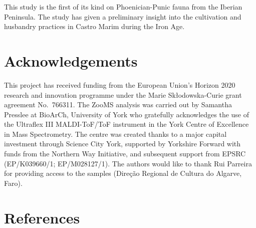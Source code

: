 \documentclass[preprint, 3p, authoryear]{elsarticle} %
\begin{document}
This study is the first of its kind on Phoenician-Punic fauna from the Iberian Peninsula. The study has given a preliminary insight into the cultivation and husbandry practices in Castro Marim during the Iron Age.

\hypertarget{acknowledgements}{%
\section{Acknowledgements}\label{acknowledgements}}

This project has received funding from the European Union's Horizon 2020 research and innovation programme under the Marie Skłodowska-Curie grant agreement No.~766311. The ZooMS analysis was carried out by Samantha Presslee at BioArCh, University of York who gratefully acknowledges the use of the Ultraflex III MALDI-ToF/ToF instrument in the York Centre of Excellence in Mass Spectrometry. The centre was created thanks to a major capital investment through Science City York, supported by Yorkshire Forward with funds from the Northern Way Initiative, and subsequent support from EPSRC (EP/K039660/1; EP/M028127/1). The authors would like to thank Rui Parreira for providing access to the samples (Direção Regional de Cultura do Algarve, Faro).

\hypertarget{references}{%
\section*{References}\label{references}}
\end{document}
